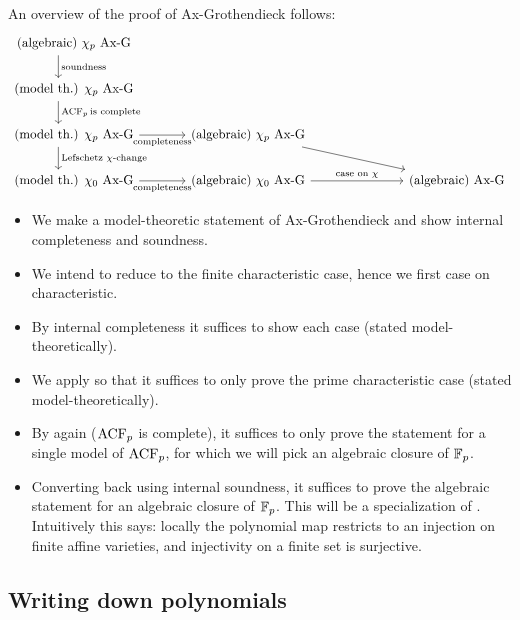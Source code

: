 An overview of the proof of Ax-Grothendieck follows:
\[\begin{tikzcd}[column sep=large]
	{\text{(algebraic) $\chi_{p}$ Ax-G}} \\
	{\text{(model th.) $\chi_{p}$ Ax-G}} \\
	{\text{(model th.) }\chi_p \text{ Ax-G}} & {\text{(algebraic) }\chi_p \text{ Ax-G}} \\
	{\text{(model th.) }\chi_0 \text{ Ax-G}} & {\text{(algebraic) }\chi_0 \text{ Ax-G}} && {\text{(algebraic) Ax-G}}
	\arrow["{\ACF_{p} \text{is complete}}", shift right=5, from=2-1, to=3-1]
	\arrow["{\text{Lefschetz }\chi\text{-change}}", shift right=5, from=3-1, to=4-1]
  \arrow["{\text{soundness}}", shift right=5, from=1-1, to=2-1]
  \arrow["{\text{completeness}}"', from=3-1, to=3-2]
	\arrow["{\text{completeness}}"', from=4-1, to=4-2]
	\arrow[from=3-2, to=4-4]
	\arrow["{\text{case on }\chi}", from=4-2, to=4-4]
\end{tikzcd}\]

\begin{itemize}
  \item We make a model-theoretic statement of Ax-Grothendieck
        and show internal completeness and soundness.
  \item We intend to reduce to the finite characteristic case,
        hence we first case on characteristic.
  \item By internal completeness it suffices to show
        each case (stated model-theoretically).
  \item We apply 
        so that it suffices to only prove the prime characteristic case
        (stated model-theoretically).
  \item By  again ($\operatorname{ACF}_{p}$ is complete),
        it suffices to only prove the statement for a single model of $\operatorname{ACF}_{p}$,
        for which we will pick an algebraic closure of $\mathbb{F}_{p}$.
  \item Converting back using internal soundness, it suffices to prove
        the algebraic statement for an algebraic closure of $\mathbb{F}_{p}$.
        This will be a specialization of
        .
        Intuitively this says: locally the polynomial map restricts to an injection
        on finite affine varieties, and injectivity on a finite set is surjective.
\end{itemize}

\subsection{Writing down polynomials}

